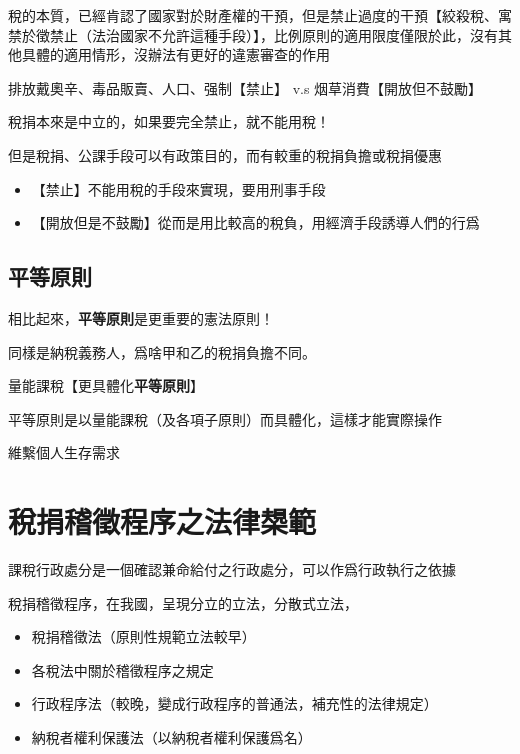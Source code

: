 \documentclass[]{ctexbook}
\providecommand{\tightlist}{%
  \setlength{\itemsep}{0pt}\setlength{\parskip}{0pt}}
\begin{document}
稅的本質，已經肯認了國家對於財產權的干預，但是禁止過度的干預【絞殺稅、寓禁於徵禁止（法治國家不允許這種手段）】，比例原則的適用限度僅限於此，沒有其他具體的適用情形，沒辦法有更好的違憲審查的作用

排放戴奧辛、毒品販賣、人口、强制【禁止】
v.s
烟草消費【開放但不鼓勵】

稅捐本來是中立的，如果要完全禁止，就不能用稅！

但是稅捐、公課手段可以有政策目的，而有較重的稅捐負擔或稅捐優惠

\begin{itemize}
\tightlist
\item
  【禁止】不能用稅的手段來實現，要用刑事手段
\item
  【開放但是不鼓勵】從而是用比較高的稅負，用經濟手段誘導人們的行爲
\end{itemize}

\hypertarget{ux5e73ux7b49ux539fux5247}{%
\subsection{平等原則}\label{ux5e73ux7b49ux539fux5247}}

相比起來，\textbf{平等原則}是更重要的憲法原則！

同樣是納稅義務人，爲啥甲和乙的稅捐負擔不同。

量能課稅【更具體化\textbf{平等原則}】

平等原則是以量能課稅（及各項子原則）而具體化，這樣才能實際操作

維繫個人生存需求

\hypertarget{ux7a05ux6350ux7a3dux5fb5ux7a0bux5e8fux4e4bux6cd5ux5f8bux69fcux7bc4}{%
\section{稅捐稽徵程序之法律槼範}\label{ux7a05ux6350ux7a3dux5fb5ux7a0bux5e8fux4e4bux6cd5ux5f8bux69fcux7bc4}}

課稅行政處分是一個確認兼命給付之行政處分，可以作爲行政執行之依據

稅捐稽徵程序，在我國，呈現分立的立法，分散式立法，

\begin{itemize}
\tightlist
\item
  稅捐稽徵法（原則性規範立法較早）
\item
  各稅法中關於稽徵程序之規定
\item
  行政程序法（較晚，變成行政程序的普通法，補充性的法律規定）
\item
  納稅者權利保護法（以納稅者權利保護爲名）
\end{itemize}
\end{document}
